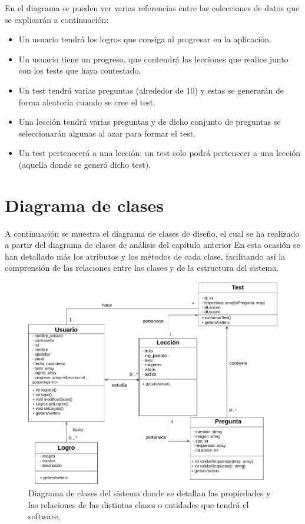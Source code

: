 En el diagrama se pueden ver varias referencias entre las colecciones de datos que se explicarán a continuación:
\begin{itemize}
    \item Un usuario tendrá los logros que consiga al progresar en la aplicación.
    \item Un usuario tiene un progreso, que contendrá las lecciones que realice junto con los tests que haya contestado.
    \item Un test tendrá varias preguntas (alrededor de 10) y estas se generarán de forma aleatoria cuando se cree el test.
    \item Una lección tendrá varias preguntas y de dicho conjunto de preguntas se seleccionarán algunas al azar para formar el test.
    \item Un test pertenecerá a una lección: un test solo podrá pertenecer a una lección (aquella donde se generó dicho test).
\end{itemize}

\section{Diagrama de clases}
A continuación se muestra el diagrama de clases de diseño, el cual se ha realizado a partir del diagrama de clases de análisis del capítulo anterior En esta ocasión se han detallado más
los atributos y los métodos de cada clase, facilitando así la comprensión de las relaciones entre las clases y de la estructura del sistema.
\begin{figure}[H]
    \centering
    \centerline{\includegraphics[width=\textwidth]{imagenes/c6/diagramadeclases.png}}
    \caption{Diagrama de clases del sistema donde se detallan las propiedades y las relaciones de las distintas clases o entidades que tendrá el software.}
    \label{fig:diagramadeclases}    
\end{figure}

